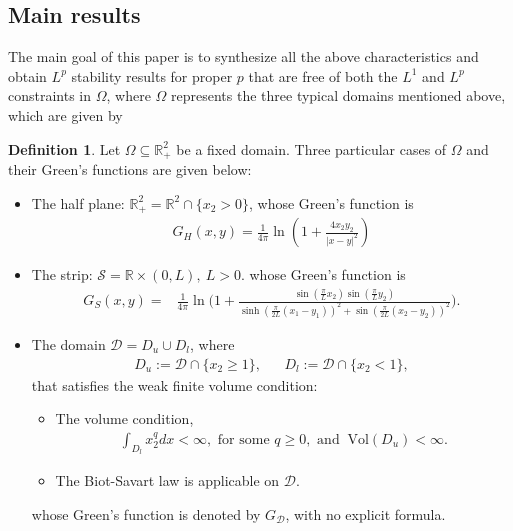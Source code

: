 \documentclass[11pt,letterpaper]{amsart}
\theoremstyle{definition}
\newtheorem{definition}[thm]{Definition}
\theoremstyle{remark}
\newcommand{\D}{\mathcal{D}}
\renewcommand{\S}{\mathcal{S}}
\newcommand{\R}{\mathbb{R}}
\renewcommand{\O}{\Omega}
\renewcommand{\tt}[1]{\text{#1}}
\numberwithin{equation}{section}
\begin{document}
\subsection{Main results} \label{sec:main results}
The main goal of this paper is to synthesize all the above characteristics and obtain $L^p$ stability results for proper $p$ that are free of both the $L^1$ and $L^p$ constraints in $\O$, where $\O$ represents the three typical domains mentioned above, which are given by
\begin{definition} 
    Let $\O\subseteq\R^2_+$ be a fixed domain. Three particular cases of $\O$ and their Green’s functions are given below:
    \begin{itemize}
        \item The half plane: $\R^2_+=\R^2\cap\{ x_2 >0 \}$, whose Green’s function is 
        \begin{align}
            G_H(x,y)=\frac{1}{4\pi} \ln \left( 1 + \frac{4x_2y_2}{|x-y|^2} \right) \label{def:green's function for half plane}
        \end{align}
        
        \item The strip: $\S=\R \times (0,L), ~ L>0$. whose Green’s function is
        \begin{align}
            G_S(x,y)=&\frac{1}{4\pi}\ln\Big(1+\frac{\sin(\frac{\pi}{L}x_2)\sin(\frac{\pi}{L}y_2)}{\sinh(\frac{\pi}{2L}(x_1-y_1))^2+\sin(\frac{\pi}{2L}(x_2-y_2))^2}\Big). \label{def:green's function for strip}
        \end{align}

        \item The domain $\D = D_u\cup D_l$, 
        where
        \begin{align}
            D_u := \mathcal{D} \cap \{x_2\ge 1\}, && D_l := \D \cap \{x_2<1\}, \label{def:upper and lower part of domain}
        \end{align}
        that satisfies the weak finite volume condition:
        \begin{itemize}
            \item[*] The volume condition,       
                \begin{align}
                    \int_{D_l} x_2^q dx<\infty, \tt{ for some } q\geq 0,\tt{ and } ~ \tt{Vol}(D_u)<\infty. \label{def:weak_finite_volume_domain_assumption}
                \end{align}
            \item[*] The Biot-Savart law is applicable on $\D$.
        \end{itemize}
        whose Green’s function is denoted by $G_\D$, with no explicit formula.
    \end{itemize}
\end{definition}
\end{document}
